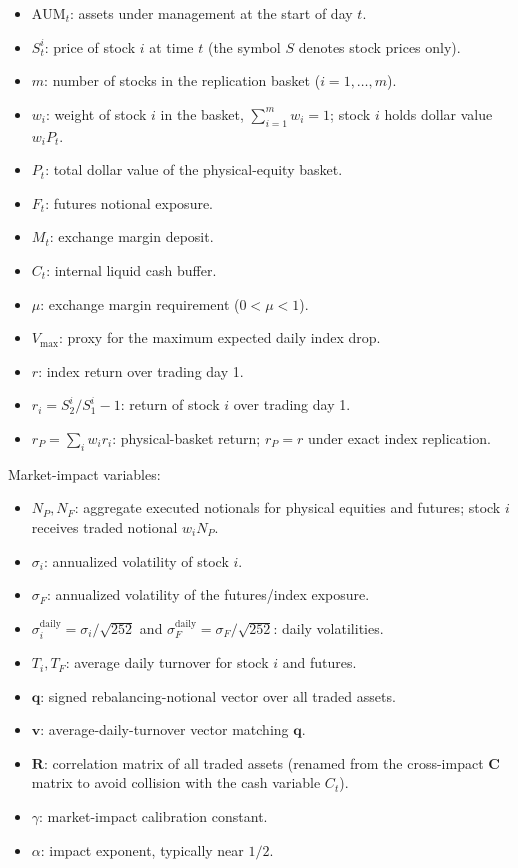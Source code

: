 \documentclass[11pt]{article}
\begin{document}
\begin{itemize}
  \item $\mathrm{AUM}_t$: assets under management at the start of day $t$.
  \item $S_t^i$: price of stock $i$ at time $t$ (the symbol $S$ denotes stock
  prices only).
  \item $m$: number of stocks in the replication basket ($i = 1,\ldots,m$).
  \item $w_i$: weight of stock $i$ in the basket, $\sum_{i=1}^{m} w_i = 1$;
  stock $i$ holds dollar value $w_i P_t$.
  \item $P_t$: total dollar value of the physical-equity basket.
  \item $F_t$: futures notional exposure.
  \item $M_t$: exchange margin deposit.
  \item $C_t$: internal liquid cash buffer.
  \item $\mu$: exchange margin requirement ($0 < \mu < 1$).
  \item $V_{\mathrm{max}}$: proxy for the maximum expected daily index drop.
  \item $r$: index return over trading day 1.
  \item $r_i = S_2^i/S_1^i - 1$: return of stock $i$ over trading day 1.
  \item $r_P = \sum_{i} w_i r_i$: physical-basket return; $r_P = r$ under exact
  index replication.
\end{itemize}

Market-impact variables:

\begin{itemize}
  \item $N_P, N_F$: aggregate executed notionals for physical equities and
  futures; stock $i$ receives traded notional $w_i N_P$.
  \item $\sigma_i$: annualized volatility of stock $i$.
  \item $\sigma_F$: annualized volatility of the futures/index exposure.
  \item $\sigma_i^{\mathrm{daily}} = \sigma_i / \sqrt{252}$ and
  $\sigma_F^{\mathrm{daily}} = \sigma_F / \sqrt{252}$: daily volatilities.
  \item $T_i, T_F$: average daily turnover for stock $i$ and futures.
  \item $\mathbf{q}$: signed rebalancing-notional vector over all traded assets.
  \item $\mathbf{v}$: average-daily-turnover vector matching $\mathbf{q}$.
  \item $\mathbf{R}$: correlation matrix of all traded assets (renamed from the
  cross-impact $\mathbf{C}$ matrix to avoid collision with the cash variable
  $C_t$).
  \item $\gamma$: market-impact calibration constant.
  \item $\alpha$: impact exponent, typically near $1/2$.
\end{itemize}
\end{document}
